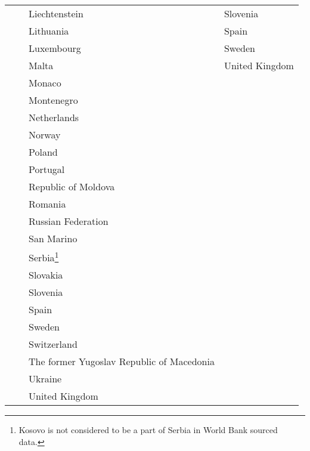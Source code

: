 \begin{longtable}{p{3.5cm}p{2.5cm}p{4.5cm}p{2.5cm}}
   &  & Liechtenstein & Slovenia \\ 
   &  & Lithuania & Spain \\ 
   &  & Luxembourg & Sweden \\ 
   &  & Malta & United Kingdom \\ 
   &  & Monaco &  \\ 
   &  & Montenegro &  \\ 
   &  & Netherlands &  \\ 
   &  & Norway &  \\ 
   &  & Poland &  \\ 
   &  & Portugal &  \\ 
   &  & Republic of Moldova &  \\ 
   &  & Romania &  \\ 
   &  & Russian Federation &  \\ 
   &  & San Marino &  \\ 
   &  & Serbia\footnote{Kosovo is not considered to be a part of Serbia in World Bank sourced data.} &  \\ 
   &  & Slovakia &  \\ 
   &  & Slovenia &  \\ 
   &  & Spain &  \\ 
   &  & Sweden &  \\ 
   &  & Switzerland &  \\ 
   &  & The former Yugoslav Republic of Macedonia &  \\ 
   &  & Ukraine &  \\ 
   &  & United Kingdom &  \\ 
   \bottomrule
\hline
\end{longtable}
